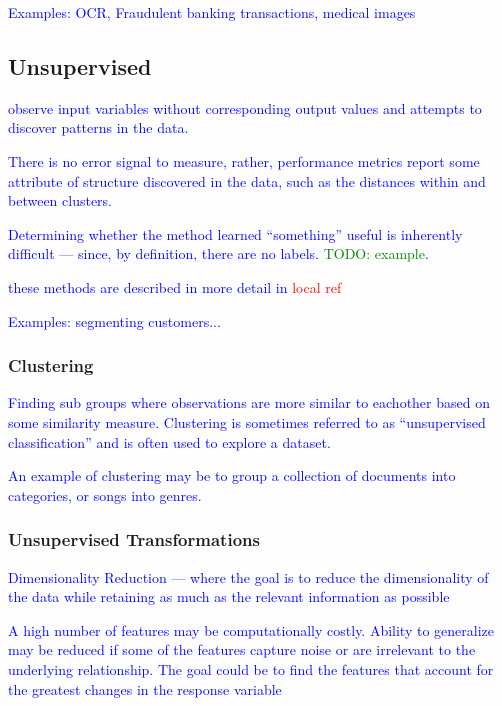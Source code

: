 \textcolor{blue}{Examples: OCR, Fraudulent banking transactions, medical images}

\subsection{Unsupervised}

\textcolor{blue}{observe input variables without corresponding output values and attempts to discover patterns in the data.}

\textcolor{blue}{There is no error signal to measure, rather, performance metrics report some attribute of structure discovered in the data, such as the distances within and between clusters.}

\textcolor{blue}{Determining whether the method learned ``something'' useful is inherently difficult --- since, by definition, there are no labels. \textcolor{green}{TODO: example}.}


\textcolor{blue}{these methods are described in more detail in \textcolor{red}{local ref}}

\textcolor{blue}{Examples: segmenting customers...}
 
\subsubsection{Clustering}

\textcolor{blue}{Finding sub groups where observations are more similar to eachother based on some similarity measure. Clustering is sometimes referred to as ``unsupervised classification'' and is often used to explore a dataset.}

\textcolor{blue}{An example of clustering may be to group a collection of documents into categories, or songs into genres.}

\subsubsection{Unsupervised Transformations}

\textcolor{blue}{Dimensionality Reduction --- where the goal is to reduce the dimensionality of the data while retaining as much as the relevant information as possible}


\textcolor{blue}{A high number of features may be computationally costly. Ability to generalize may be reduced if some of the features capture noise or are irrelevant to the underlying relationship. The goal could be to find the features that account for the greatest changes in the response variable}


